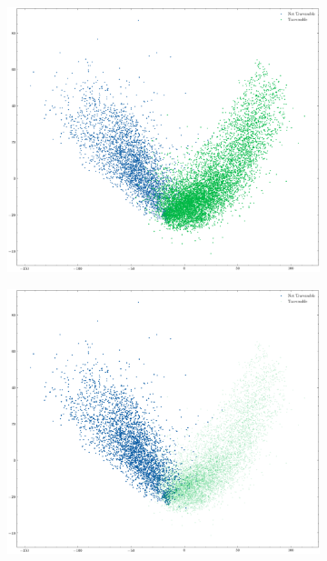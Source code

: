 \documentclass[../document.tex]{subfiles}
\begin{document}
\begin{figure}[H]
    \centering
    \begin{subfigure}[b]{1\textwidth}
        \includegraphics[width=\linewidth]{../img/5/pca/pca.png}
    \end{subfigure}
    \begin{subfigure}[b]{0.48\textwidth}
        \includegraphics[width=\linewidth]{../img/5/pca/pca-0.png}
    \end{subfigure}
    \begin{subfigure}[b]{0.48\textwidth}

\end{subfigure}
\end{figure}
\end{document}
